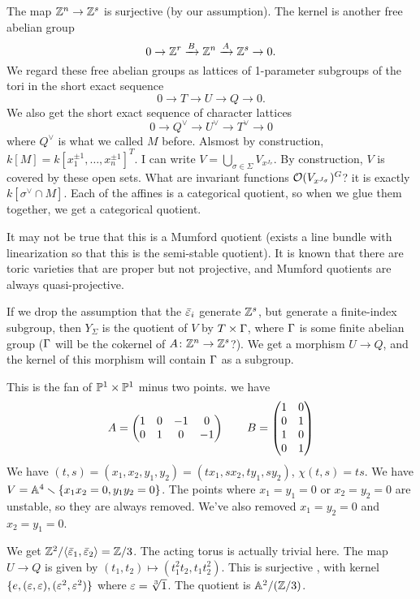 The map $\ZZ^n\to \ZZ^s$ is surjective (by our assumption). The kernel is another free abelian group
\[
 0\to \ZZ^r\xrightarrow B \ZZ^n\xrightarrow A \ZZ^s\to 0.
\]
We regard these free abelian groups as lattices of 1-parameter subgroups of the tori in the short exact sequence
\[
 0\to T\to U\to Q\to 0.
\]
We also get the short exact sequence of character lattices
\[
 0\to Q^\vee\to U^\vee\to T^\vee\to 0
\]
where $Q^\vee$ is what we called $M$ before. Alsmost by construction, $k[M]=k[x_1^{\pm 1},\dots, x_n^{\pm 1}]^T$. I can write $V=\bigcup_{\sigma\in \Sigma}V_{x^{J_\sigma}}$. By construction, $V$ is covered by these open sets. What are invariant functions $\O(V_{x^{J_\sigma}})^G$? it is exactly $k[\sigma^\vee\cap M]$. Each of the affines is a categorical quotient, so when we glue them together, we get a categorical quotient.
\begin{remark}
 It may not be true that this is a Mumford quotient (exists a line bundle with linearization so that this is the semi-stable quotient). It is known that there are toric varieties that are proper but not projective, and Mumford quotients are always quasi-projective.
\end{remark}
\begin{remark}
 If we drop the assumption that the $\bar\e_i$ generate $\ZZ^s$, but generate a finite-index subgroup, then $Y_\Sigma$ is the quotient of $V$ by $T\times \Ga$, where $\Ga$ is some finite abelian group ($\Ga$ will be the cokernel of $A\colon \ZZ^n\to \ZZ^s$?). We get a morphism $U\to Q$, and the kernel of this morphism will contain $\Ga$ as a subgroup.
\end{remark}
\begin{example}
  This is the fan of $\PP^1\times \PP^1$ minus two points. we have
 \[
  A=\Matx{1&0&-1&0\\ 0&1&0&-1}\qquad B=\Matx{1&0\\ 0&1\\ 1&0\\ 0&1}
 \]
 We have $(t,s)=(x_1,x_2,y_1,y_2)=(tx_1,sx_2,ty_1,sy_2)$, $\chi(t,s)=ts$. We have $V=\AA^4\setminus\{x_1x_2=0,y_1y_2=0\}$. The points where $x_1=y_1=0$ or $x_2=y_2=0$ are unstable, so they are always removed. We've also removed $x_1=y_2=0$ and $x_2=y_1=0$.
\end{example}
\begin{example}
  We get $\ZZ^2/\<\bar\e_1,\bar\e_2\>=\ZZ/3$. The acting torus is actually trivial here. The map $U\to Q$ is given by $(t_1,t_2)\mapsto(t_1^2t_2,t_1t_2^2)$. This is surjective \anton{}, with kernel $\{e,(\e,\e),(\e^2,\e^2)\}$ where $\e=\sqrt[3]{1}$. The quotient is $\AA^2/(\ZZ/3)$.
\end{example}

